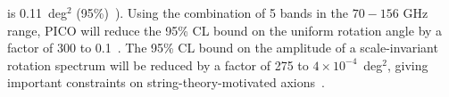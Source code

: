 \documentclass[PICOReport.tex]{subfiles}
\begin{document}
is 0.11~deg$^2$ (95\%)~\citep{Array:2017rlf}). Using the combination of 5 bands in the $70-156$ GHz range, PICO will reduce the 95\% CL bound on the uniform rotation angle by a factor of 300 to 0.1~\arcmin . 
The 95\% CL bound on the amplitude of a scale-invariant rotation spectrum will be reduced by a factor of 275 to $4\times10^{-4}$~deg$^2$, giving important constraints on string-theory-motivated axions~\cite{Svrcek:2006yi,Pospelov:2008gg}.


\end{document}

